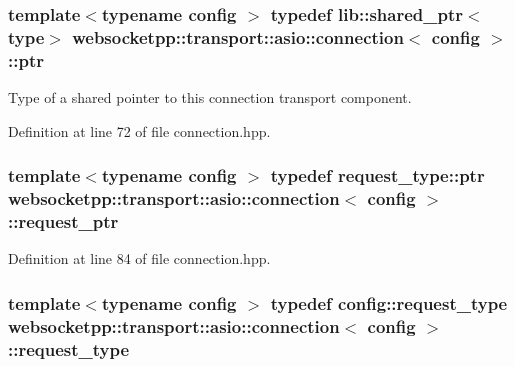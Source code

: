 \subsubsection[{ptr}]{\setlength{\rightskip}{0pt plus 5cm}template$<$typename config $>$ typedef lib\+::shared\+\_\+ptr$<${\bf type}$>$ {\bf websocketpp\+::transport\+::asio\+::connection}$<$ config $>$\+::{\bf ptr}}\label{classwebsocketpp_1_1transport_1_1asio_1_1connection_aa6f25556860a154c4dacb4dac1dce8e4}


Type of a shared pointer to this connection transport component. 



Definition at line 72 of file connection.\+hpp.

\hypertarget{classwebsocketpp_1_1transport_1_1asio_1_1connection_a3580e74fb64d30d32f9cac3af47e4954}{}
\subsubsection[{request\+\_\+ptr}]{\setlength{\rightskip}{0pt plus 5cm}template$<$typename config $>$ typedef request\+\_\+type\+::ptr {\bf websocketpp\+::transport\+::asio\+::connection}$<$ config $>$\+::{\bf request\+\_\+ptr}}\label{classwebsocketpp_1_1transport_1_1asio_1_1connection_a3580e74fb64d30d32f9cac3af47e4954}


Definition at line 84 of file connection.\+hpp.

\hypertarget{classwebsocketpp_1_1transport_1_1asio_1_1connection_abe1fcb3f42039ea64c0fd3bf42b7c026}{}
\subsubsection[{request\+\_\+type}]{\setlength{\rightskip}{0pt plus 5cm}template$<$typename config $>$ typedef config\+::request\+\_\+type {\bf websocketpp\+::transport\+::asio\+::connection}$<$ config $>$\+::{\bf request\+\_\+type}}\label{classwebsocketpp_1_1transport_1_1asio_1_1connection_abe1fcb3f42039ea64c0fd3bf42b7c026}


